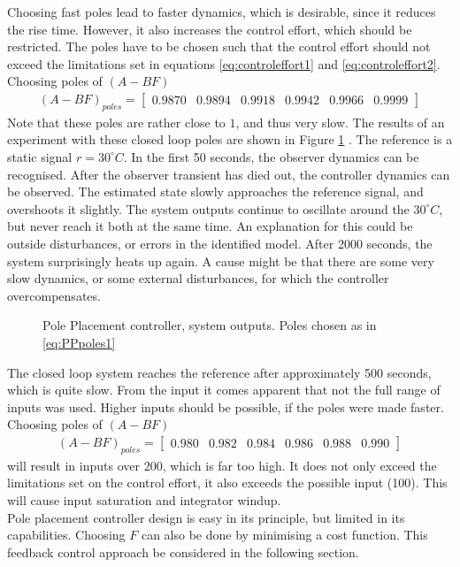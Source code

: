 Choosing fast poles lead to faster dynamics, which is desirable, since it reduces the rise time. However, it also increases the control effort, which should be restricted. The poles have to be chosen such that the control effort should not exceed the limitations set in equations \ref{eq:controleffort1} and \ref{eq:controleffort2}. Choosing poles of $(A-BF)$
\begin{align}
    (A-BF)_{poles} = \begin{bmatrix} 0.9870 & 0.9894 & 0.9918 & 0.9942 & 0.9966 & 0.9999 \end{bmatrix} \label{eq:PPpoles1}
\end{align}
Note that these poles are rather close to $1$, and thus very slow. The results of an experiment with these closed loop poles are shown in Figure \ref{fig:PPexp1} . The reference is a static signal $r = 30^{\circ}C$. In the first 50 seconds, the observer dynamics can be recognised. After the observer transient has died out, the controller dynamics can be observed. The estimated state slowly approaches the reference signal, and overshoots it slightly. The system outputs continue to oscillate around the $30^{\circ}C$, but never reach it both at the same time. An explanation for this could be outside disturbances, or errors in the identified model. After 2000 seconds, the system surprisingly heats up again. A cause might be that there are some very slow dynamics, or some external disturbances, for which the controller overcompensates.
\begin{figure}
    \centering
    
    \caption{Pole Placement controller, system outputs. Poles chosen as in \ref{eq:PPpoles1}}
    \label{fig:PPexp1}
\end{figure}
The closed loop system reaches the reference after approximately 500 seconds, which is quite slow. From the input it comes apparent that not the full range of inputs was used. Higher inputs should be possible, if the poles were made faster. Choosing poles of $(A-BF)$
\begin{align}
    (A-BF)_{poles} = \begin{bmatrix} 0.980 & 0.982 & 0.984 & 0.986 & 0.988 & 0.990 \end{bmatrix} \nonumber
\end{align}
will result in inputs over 200, which is far too high. It does not only exceed the limitations set on the control effort, it also exceeds the possible input (100). This will cause input saturation and integrator windup.\\
Pole placement controller design is easy in its principle, but limited in its capabilities. Choosing $F$ can also be done by minimising a cost function. This feedback control approach be considered in the following section.

